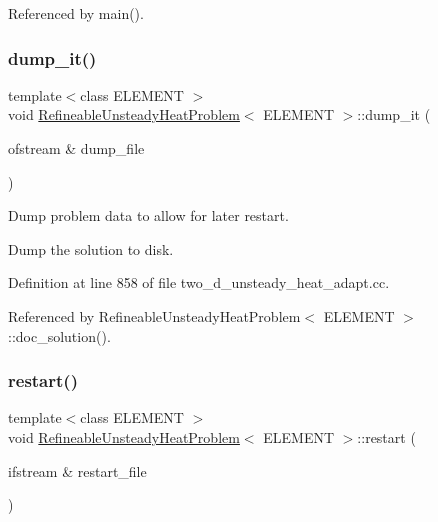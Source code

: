 Referenced by main().

\mbox{\label{classRefineableUnsteadyHeatProblem_a1fb939c3f9c258fd49328bb1516ced98}} 
\subsubsection{\texorpdfstring{dump\+\_\+it()}{dump\_it()}}
{\footnotesize\ttfamily template$<$class E\+L\+E\+M\+E\+NT $>$ \\
void \hyperlink{classRefineableUnsteadyHeatProblem}{Refineable\+Unsteady\+Heat\+Problem}$<$ E\+L\+E\+M\+E\+NT $>$\+::dump\+\_\+it (\begin{DoxyParamCaption}\item[{ofstream \&}]{dump\+\_\+file }\end{DoxyParamCaption})}



Dump problem data to allow for later restart. 

Dump the solution to disk. 

Definition at line 858 of file two\+\_\+d\+\_\+unsteady\+\_\+heat\+\_\+adapt.\+cc.



Referenced by Refineable\+Unsteady\+Heat\+Problem$<$ E\+L\+E\+M\+E\+N\+T $>$\+::doc\+\_\+solution().

\mbox{\label{classRefineableUnsteadyHeatProblem_af36fa71e72852367411e21b50b179625}} 
\subsubsection{\texorpdfstring{restart()}{restart()}}
{\footnotesize\ttfamily template$<$class E\+L\+E\+M\+E\+NT $>$ \\
void \hyperlink{classRefineableUnsteadyHeatProblem}{Refineable\+Unsteady\+Heat\+Problem}$<$ E\+L\+E\+M\+E\+NT $>$\+::restart (\begin{DoxyParamCaption}\item[{ifstream \&}]{restart\+\_\+file }\end{DoxyParamCaption})}



